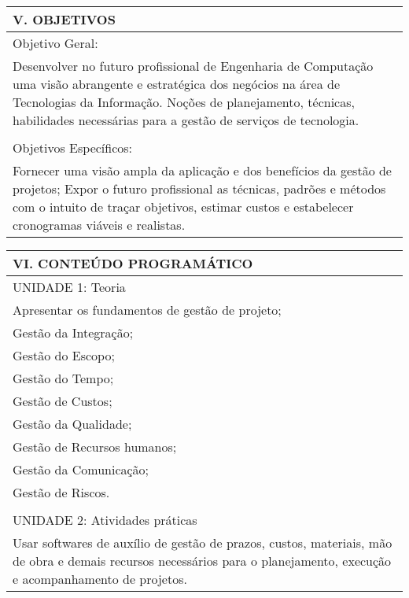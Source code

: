 \documentclass[12pt]{article}
\begin{document}
\begin{longtable}{|L{1.025\textwidth}|} \hline
%
{\bf V. OBJETIVOS } \\ \hline
Objetivo Geral: \\

Desenvolver no futuro profissional de Engenharia de Computação uma visão abrangente e estratégica dos negócios na área de Tecnologias da Informação. Noções de planejamento, técnicas, habilidades necessárias para a gestão de serviços de tecnologia.\\
\\
Objetivos Específicos:\\

Fornecer uma visão ampla da aplicação e dos benefícios da gestão de projetos;
Expor o futuro profissional as técnicas, padrões e métodos com o intuito de traçar objetivos, estimar custos e estabelecer cronogramas viáveis e realistas. 
\\ \hline
\end{longtable}


\begin{longtable}{|L{1.025\textwidth}|} \hline
%
{\bf VI. CONTEÚDO PROGRAMÁTICO } \\ \hline
UNIDADE 1: Teoria\\
Apresentar os fundamentos de gestão de projeto;\\
Gestão da Integração;\\
Gestão do Escopo;\\
Gestão do Tempo;\\
Gestão de Custos;\\
Gestão da Qualidade;\\
Gestão de Recursos humanos;\\
Gestão da Comunicação;\\
Gestão de Riscos.\\
\\
UNIDADE 2: Atividades práticas\\
Usar softwares de auxílio de gestão de prazos, custos, materiais, mão de obra e demais recursos necessários para o planejamento, execução e acompanhamento de projetos.

\\ \hline
\end{longtable} 

\end{document}
